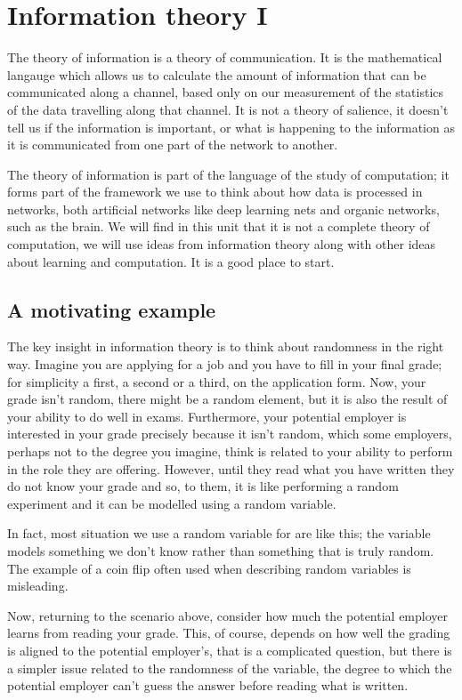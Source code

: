 \documentclass[12pt]{article}
\begin{document}
\section*{Information theory I} 

The theory of information is a theory of communication. It is the
mathematical langauge which allows us to calculate the amount of
information that can be communicated along a channel, based only on
our measurement of the statistics of the data travelling along that
channel. It is not a theory of salience, it doesn't tell us if the
information is important, or what is happening to the information as
it is communicated from one part of the network to another.

The theory of information is part of the language of the study of
computation; it forms part of the framework we use to think about how
data is processed in networks, both artificial networks like deep
learning nets and organic networks, such as the brain. We will find in
this unit that it is not a complete theory of computation, we will use
ideas from information theory along with other ideas about learning
and computation. It is a good place to start.

\subsection*{A motivating example}

The key insight in information theory is to think about randomness in
the right way. Imagine you are applying for a job and you have to fill
in your final grade; for simplicity a first, a second or a third, on
the application form. Now, your grade isn't random, there might be a
random element, but it is also the result of your ability to do well
in exams. Furthermore, your potential employer is interested in your
grade precisely because it isn't random, which some employers, perhaps
not to the degree you imagine, think is related to your ability to
perform in the role they are offering. However, until they read what
you have written they do not know your grade and so, to them, it is
like performing a random experiment and it can be modelled using a
random variable.

In fact, most situation we use a random variable for are like this;
the variable models something we don't know rather than something that
is truly random. The example of a coin flip often used when describing
random variables is misleading.

Now, returning to the scenario above, consider how much the potential
employer learns from reading your grade. This, of course, depends on
how well the grading is aligned to the potential employer's, that is a
complicated question, but there is a simpler issue related to the
randomness of the variable, the degree to which the potential employer
can't guess the answer before reading what is written. 
\end{document}
